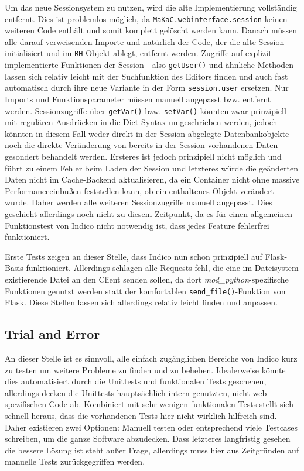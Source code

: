 Um das neue Sessionsystem zu nutzen, wird die alte Implementierung vollständig entfernt. Dies ist
problemlos möglich, da \lstinline{MaKaC.webinterface.session} keinen weiteren Code enthält und somit
komplett gelöscht werden kann. Danach müssen alle darauf verweisenden Importe und natürlich der
Code, der die alte Session initialisiert und im \lstinline{RH}-Objekt ablegt, entfernt werden.
Zugriffe auf explizit implementierte Funktionen der Session - also \lstinline{getUser()} und
ähnliche Methoden - lassen sich relativ leicht mit der Suchfunktion des Editors finden und auch fast
automatisch durch ihre neue Variante in der Form \lstinline{session.user} ersetzen. Nur Imports und
Funktionsparameter müssen manuell angepasst bzw. entfernt werden. Sessionzugriffe über
\lstinline{getVar()} bzw. \lstinline{setVar()} könnten zwar prinzipiell mit regulären
Ausdrücken in die Dict-Syntax umgeschrieben werden, jedoch könnten in diesem Fall weder direkt in
der Session abgelegte Datenbankobjekte noch die direkte Veränderung von bereits in der Session
vorhandenen Daten gesondert behandelt werden. Ersteres ist jedoch prinzipiell nicht möglich und
führt zu einem Fehler beim Laden der Session und letzteres würde die geänderten Daten nicht im
Cache-Backend aktualisieren, da ein Container nicht ohne massive Performanceeinbußen feststellen
kann, ob ein enthaltenes Objekt verändert wurde. Daher werden alle weiteren Sessionzugriffe
manuell angepasst. Dies geschieht allerdings noch nicht zu diesem Zeitpunkt, da es für einen
allgemeinen Funktionstest von Indico nicht notwendig ist, dass jedes Feature fehlerfrei
funktioniert.

Erste Tests zeigen an dieser Stelle, dass Indico nun schon prinzipiell auf Flask-Basis funktioniert.
Allerdings schlagen alle Requests fehl, die eine im Dateisystem existierende Datei an den Client
senden sollen, da dort \emph{mod\_python}-spezifische Funktionen genutzt werden statt der
komfortablen \lstinline{send_file()}-Funktion von Flask. Diese Stellen lassen sich allerdings
relativ leicht finden und anpassen.


\subsection{Trial and Error}
An dieser Stelle ist es sinnvoll, alle einfach zugänglichen Bereiche von Indico kurz zu testen um
weitere Probleme zu finden und zu beheben. Idealerweise könnte dies automatisiert durch die
Unittests und funktionalen Tests geschehen, allerdings decken die Unittests hauptsächlich intern
genutzten, nicht-web-spezifischen Code ab. Kombiniert mit sehr wenigen funktionalen Tests stellt
sich schnell heraus, dass die vorhandenen Tests hier nicht wirklich hilfreich sind. Daher existieren
zwei Optionen: Manuell testen oder entsprechend viele Testcases schreiben, um die ganze Software
abzudecken. Dass letzteres langfristig gesehen die bessere Lösung ist steht außer Frage, allerdings
muss hier aus Zeitgründen auf manuelle Tests zurückgegriffen werden.

